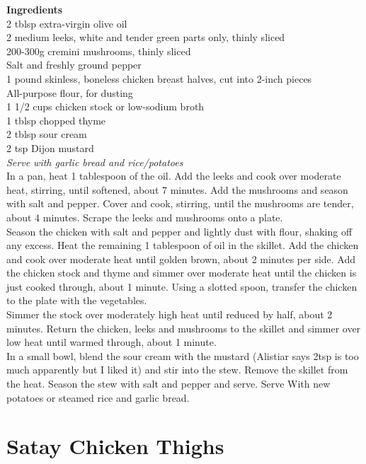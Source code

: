 \documentclass[18pt, oneside]{book}
\begin{document}
\textbf{Ingredients}\\ 
2 tblsp extra-virgin olive oil \\
2 medium leeks, white and tender green parts only, thinly sliced \\
200-300g cremini mushrooms, thinly sliced \\
Salt and freshly ground pepper \\
1 pound skinless, boneless chicken breast halves, cut into 2-inch pieces \\
All-purpose flour, for dusting \\
1 1/2 cups chicken stock or low-sodium broth \\
1 tblsp chopped thyme \\ 
2 tblsp sour cream \\
2 tsp Dijon mustard \\

\textit{Serve with garlic bread and rice/potatoes} \\

In a pan, heat 1 tablespoon of the oil. Add the leeks and cook over moderate heat, stirring, until softened, about 7 minutes. Add the mushrooms and season with salt and pepper. Cover and cook, stirring, until the mushrooms are tender, about 4 minutes. Scrape the leeks and mushrooms onto a plate. \\

Season the chicken with salt and pepper and lightly dust with flour, shaking off any excess. Heat the remaining 1 tablespoon of oil in the skillet. Add the chicken and cook over moderate heat until golden brown, about 2 minutes per side. Add the chicken stock and thyme and simmer over moderate heat until the chicken is just cooked through, about 1 minute. Using a slotted spoon, transfer the chicken to the plate with the vegetables. \\

Simmer the stock over moderately high heat until reduced by half, about 2 minutes. Return the chicken, leeks and mushrooms to the skillet and simmer over low heat until warmed through, about 1 minute.  \\

In a small bowl, blend the sour cream with the mustard (Alistiar says 2tsp is too much apparently but I liked it) and stir into the stew. Remove the skillet from the heat. Season the stew with salt and pepper and serve. Serve With new potatoes or steamed rice and garlic bread.



\section{Satay Chicken Thighs}
\end{document}
